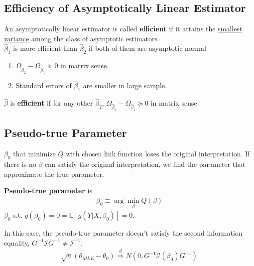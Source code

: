 \documentclass[11pt]{elegantbook}
\begin{document}
\subsection{Efficiency of Asymptotically Linear Estimator}
\begin{definition}
    \normalfont
    An asymptotically linear estimator is called \textbf{efficient} if it attains the \underline{smallest variance} among the class of asymptotic estimators.\\
    $\hat{\beta}_1$ is more efficient than $\hat{\beta}_2$ if both of them are asymptotic normal
    \begin{enumerate}[$\cdot$]
        \item $\Omega_{\hat{\beta}_2}-\Omega_{\hat{\beta}_1}\succeq 0$ in matrix sense.
        \item Standard errors of $\hat{\beta}_1$ are smaller in large sample.
    \end{enumerate}
    $\hat{\beta}$ is \textbf{efficient} if for any other $\hat{\beta}_2$, $\Omega_{\hat{\beta}_2}-\Omega_{\hat{\beta}_1}\succeq 0$ in matrix sense.
\end{definition}


\subsection{Pseudo-true Parameter}
$\beta_0$ that minimize $Q$ with chosen link function loses the original interpretation. If there is no $\beta$ can satisfy the original interpretation, we find the parameter that approximate the true parameter.
\begin{definition}
\normalfont
    \textbf{Pseudo-true parameter} is
    \begin{equation}
        \begin{aligned}
            \beta_0\equiv \arg\min_\beta Q(\beta)
        \end{aligned}
        \nonumber
    \end{equation}
    $\beta_0$ s.t. $g(\beta_0)=0=\mathbb{E}[g(Y|X,\beta_0)]=0$.
\end{definition}
In this case, the pseudo-true parameter doesn't satisfy the second information equality, $G^{-1}\mathcal{I}G^{-1}\neq \mathcal{I}^{-1}$.
\begin{equation}
    \begin{aligned}
        \sqrt{n}\left(\theta_{MLE}-\theta_0\right) \stackrel{d}{\Rightarrow} N\left(0,G^{-1}\mathcal{I}(\beta_0)G^{-1}\right)
    \end{aligned}
    \nonumber
\end{equation}
\end{document}

